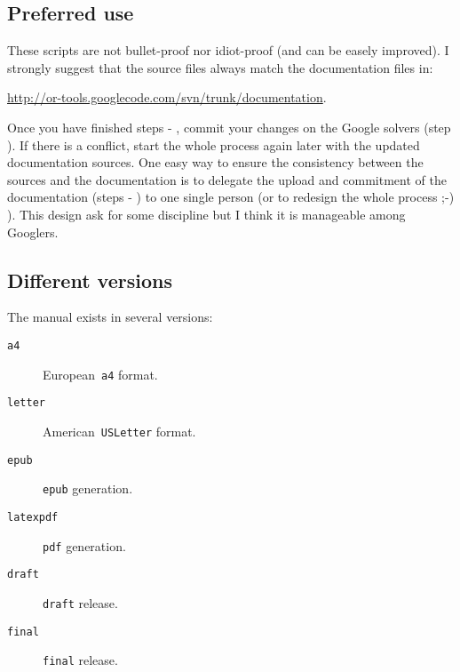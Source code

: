 \documentclass[a4paper,10pt]{article}
\newcommand{\code}[1]{\texttt{#1}}
\begin{document}
\subsection{Preferred use}

These scripts are not bullet-proof nor idiot-proof (and can be easely improved). I strongly suggest that the source files always match the documentation files in:

\begin{center}
\href{http://or-tools.googlecode.com/svn/trunk/documentation}{http://or-tools.googlecode.com/svn/trunk/documentation}.
\end{center} 

Once you have finished steps \raisebox{.5pt}{\textcircled{\raisebox{-.9pt} {1}}} - \raisebox{.5pt}{\textcircled{\raisebox{-.9pt} {6}}}, commit your changes on the Google solvers (step \raisebox{.5pt}{\textcircled{\raisebox{-.9pt} {7}}}). If there is a conflict, start the whole process again later with the updated documentation sources. One easy way to ensure the consistency between the sources and the documentation is to delegate the upload and commitment of the documentation (steps \raisebox{.5pt}{\textcircled{\raisebox{-.9pt} {8}}} - ) to one single person (or to redesign the whole process ;-) ). This design ask for some discipline but I think it is manageable among Googlers.





\subsection{Different versions}
\label{manual_different_version}

The manual exists in several versions:

\begin{description}
\item[\code{a4}] European~\code{a4} format.
\item[\code{letter}] American~\code{USLetter} format.
\item[\code{epub}] \code{epub} generation.
\item[\code{latexpdf}] \code{pdf} generation.
\item[\code{draft}] \code{draft} release.
\item[\code{final}]  \code{final} release.
\end{description}
\end{document}
